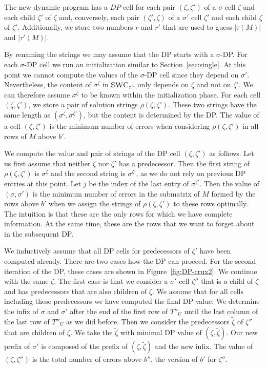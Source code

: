 The new dynamic program has a $DP$-cell for each pair $(\zeta,\zeta')$ of a $\sigma$ cell $\zeta$ and each child $\zeta'$ of $\zeta$ and, conversely,
each pair $(\zeta',\zeta)$ of a $\sigma'$ cell $\zeta'$ and each child $\zeta$ of $\zeta'$.
Additionally, we store two numbers $r$ and $r'$ that are used to guess $|\tau(M)|$ and $|\tau'(M)|$.

By renaming the strings we may assume that the DP starts with a $\sigma$-DP.
For each $\sigma$-DP cell we run an initialization similar to Section~\ref{sec:single}.
At this point we cannot compute the values of the $\sigma$-DP cell since they depend on $\sigma'$.
Nevertheless, the content of $\sigma^\zeta$ in $\textsc{SWC}_{\varepsilon^3}$ only depends on $\zeta$ and not on $\zeta'$.
We can therefore assume $\sigma^\zeta$ to be known within the initialization phase. 
For each cell $(\zeta,\zeta')$, we store a pair of solution strings $\rho(\zeta,\zeta')$.
These two strings have the same length as $(\sigma^{\zeta},\sigma^{\zeta'})$, but the content is determined by the DP.
The value of a cell $(\zeta,\zeta')$ is the minimum number of errors when considering $\rho(\zeta,\zeta')$
in all rows of $M$ above $b'$.

We compute the value and pair of strings of the DP cell $(\zeta,\zeta')$ as follows. 
Let us first assume that neither $\zeta$ nor $\zeta'$ has a predecessor.
Then the first string of $\rho(\zeta,\zeta')$ is $\sigma^\zeta$ and the second string is $\sigma^{\zeta'}$, as we do not rely on previous DP entries at this point. 
Let $j$ be the index of the last entry of $\sigma^{\zeta'}$. 
Then the value of $(\sigma,\sigma')$ is the minimum number of errors in the submatrix of $M$ formed by the rows above $b'$
when we assign the strings of $\rho(\zeta,\zeta')$ to these rows optimally.
The intuition is that these are the only rows for which we have complete information.
At the same time, these are the rows that we want to forget about in the subsequent DP.

We inductively assume that all DP cells for predecessors of $\zeta'$ have been computed already.
There are two cases how the DP can proceed. For the second iteration of the DP, these cases are shown in Figure~\ref{fig:DP-crux2}.
We continue with the same $\zeta$.
The first case is that we consider a $\sigma'$-cell $\zeta''$ that is a child of $\zeta$ and has predecessors that are also children of $\zeta$.
We assume that for all cells including these predecessors we have computed the final DP value.
We determine the infix of $\sigma$ and $\sigma'$ after the end of the first row of $T''_U$ until the last column of the last row of $T''_U$ as we did before.
Then we consider the predecessors $\tilde{\zeta}$ of $\zeta''$ that are children of $\zeta$.
We take the $\tilde{\zeta}$ with minimal DP value of $(\zeta,\tilde{\zeta})$.
Our new prefix of $\sigma'$ is composed of the prefix of $(\zeta,\tilde{\zeta})$ and the new infix.
The value of $(\zeta,\zeta'')$ is the total number of errors above $b''$, the version of $b'$ for $\zeta''$.

